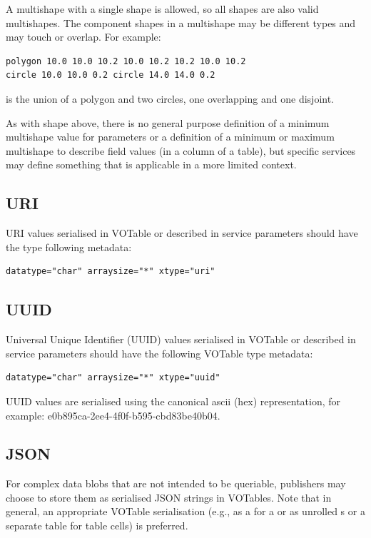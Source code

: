 \documentclass[11pt,letter]{ivoa}
\begin{document}
A multishape with a single shape is allowed, so all shapes are also valid multishapes. The
component shapes in a multishape may be different types and may touch or overlap. For example:

\begin{verbatim}
polygon 10.0 10.0 10.2 10.0 10.2 10.2 10.0 10.2
circle 10.0 10.0 0.2 circle 14.0 14.0 0.2
\end{verbatim}
\noindent is the union of a polygon and two circles, one overlapping and one disjoint.

As with shape above, there is no general purpose definition of a minimum multishape value
for parameters or a definition of a minimum or maximum multishape to describe field values
(in a column of a table), but specific services may define something that is applicable in
a more limited context.

\subsection{URI}
URI values \citep{std:RFC3986} serialised in VOTable or described in service parameters
should have the type following metadata:

\begin{verbatim}
datatype="char" arraysize="*" xtype="uri"
\end{verbatim}

\subsection{UUID}
Universal Unique Identifier (UUID) values serialised in VOTable or described in service parameters
should have the following VOTable type metadata:

\begin{verbatim}
datatype="char" arraysize="*" xtype="uuid"
\end{verbatim}

UUID values \citep{std:RFC4122} are serialised using the canonical ascii (hex)
representation, for example: e0b895ca-2ee4-4f0f-b595-cbd83be40b04.

\subsection{JSON}

For complex data blobs that are not intended to be queriable, publishers
may choose to store them as serialised JSON \citep{std:JSON} strings in
VOTables.  Note that in general, an appropriate VOTable serialisation
(e.g., as a  for a  or as unrolled
\/s or a separate table for table cells) is preferred.
\end{document}

